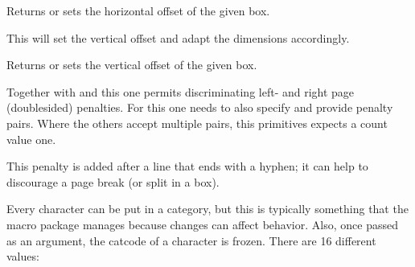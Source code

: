 \startnewprimitive[title={\prm {boxxoffset}}]

Returns or sets the horizontal offset of the given box.

\stopnewprimitive

\startnewprimitive[title={\prm {boxymove}}]

This will set the vertical offset and adapt the dimensions accordingly.

\stopnewprimitive

\startnewprimitive[title={\prm {boxyoffset}}]

Returns or sets the vertical offset of the given box.

\stopnewprimitive

\startnewprimitive[title={\prm {brokenpenalties}}]

Together with  and  this one permits
discriminating left- and right page (doublesided) penalties. For this one needs
to also specify  and provide penalty pairs. Where the others
accept multiple pairs, this primitives expects a count value one.

\stopnewprimitive

\startoldprimitive[title={\prm {brokenpenalty}}]

This penalty is added after a line that ends with a hyphen; it can help to
discourage a page break (or split in a box).

\stopoldprimitive

\startoldprimitive[title={\prm {catcode}}]

Every character can be put in a category, but this is typically
something that the macro package manages because changes can affect
behavior. Also, once passed as an argument, the catcode of a character
is frozen. There are 16 different values:

\starttabulate[|l|c|l|c|]
\NC \type {\escapecatcode     } \NC \the\escapecatcode
\NC \type {\begingroupcatcode } \NC \the\begingroupcatcode  \NC \NR
\NC \type {\endgroupcatcode   } \NC \the\endgroupcatcode
\NC \type {\mathshiftcatcode  } \NC \the\mathshiftcatcode   \NC \NR
\NC \type {\alignmentcatcode  } \NC \the\alignmentcatcode
\NC \type {\endoflinecatcode  } \NC \the\endoflinecatcode   \NC \NR
\NC \type {\parametercatcode  } \NC \the\parametercatcode
\NC \type {\superscriptcatcode} \NC \the\superscriptcatcode \NC \NR
\NC \type {\subscriptcatcode  } \NC \the\subscriptcatcode
\NC \type {\ignorecatcode     } \NC \the\ignorecatcode      \NC \NR
\NC \type {\spacecatcode      } \NC \the\spacecatcode
\NC {} \NC \the{}      \NC \NR
\NC \type {\othercatcode      } \NC \the\othercatcode
\NC \type {\activecatcode     } \NC \the\activecatcode      \NC \NR
\NC \type {\commentcatcode    } \NC \the\commentcatcode
\NC \type {\invalidcatcode    } \NC \the\invalidcatcode     \NC \NR
\stoptabulate

